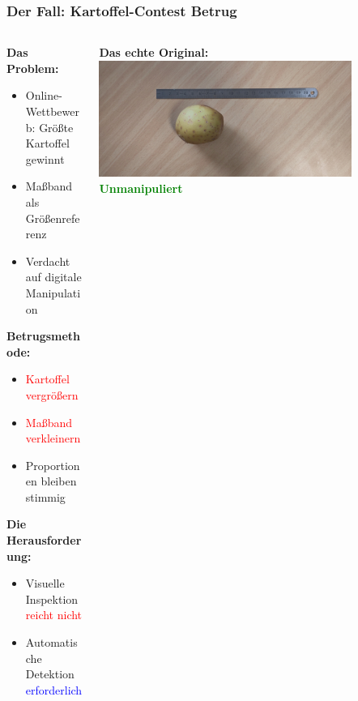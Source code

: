 \documentclass[11pt,t,usepdftitle=false,aspectratio=169]{beamer}
\begin{document}
\begin{frame}
	\frametitle{Der Fall: Kartoffel-Contest Betrug}
	
	\begin{columns}[T]
		\begin{column}{0.6\textwidth}
			\textbf{Das Problem:}
			\begin{itemize}
				\item Online-Wettbewerb: Größte Kartoffel gewinnt
				\item Maßband als Größenreferenz
				\item Verdacht auf digitale Manipulation
			\end{itemize}
			
			\textbf{Betrugsmethode:}
			\begin{itemize}
				\item \textcolor{red}{Kartoffel vergrößern}
				\item \textcolor{red}{Maßband verkleinern}
				\item Proportionen bleiben stimmig
			\end{itemize}
			
			\textbf{Die Herausforderung:}
			\begin{itemize}
				\item Visuelle Inspektion \textcolor{red}{reicht nicht}
				\item Automatische Detektion \textcolor{blue}{erforderlich}
			\end{itemize}
		\end{column}
		\begin{column}{0.4\textwidth}
			\centering
			\textbf{Das echte Original:}
			\vspace{0.3em}
			\includegraphics[width=0.8\textwidth]{images/image_2.jpg}
			\vspace{0.2em}
			\textcolor{green}{\textbf{Unmanipuliert}}
			

\end{column}
\end{columns}
\end{frame}
\end{document}
